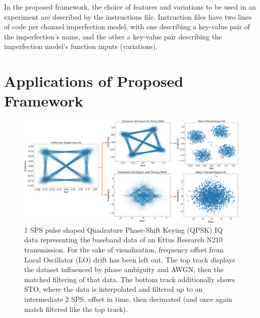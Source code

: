 In the proposed framework, the choice of features and variations to be used in an experiment are described by the instructions file. Instruction files have two lines of code per channel imperfection model, with one describing a key-value pair of the imperfection's name, and the other a key-value pair describing the imperfection model's function inputs (variations).


\section{Applications of Proposed Framework}
\label{sec3}

\begin{figure}[ht!]
	\centering	\includegraphics[width=1\textwidth,keepaspectratio]{figs/final_n210.eps}
    \caption{1 SPS pulse shaped Quadrature Phase-Shift Keying (QPSK) IQ data representing the baseband data of an Ettus Research N210 transmission. For the sake of visualization, frequency offset from Local Oscillator (LO) drift has been left out. The top track displays the dataset influenced by phase ambiguity and AWGN, then the matched filtering of that data. The bottom track additionally shows STO, where the data is interpolated and filtered up to an intermediate 2 SPS, offset in time, then decimated (and once again match filtered like the top track).} 
\label{fig:1spsslides}      
\end{figure}

